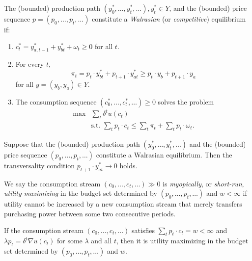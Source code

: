 \begin{defn}
    The (bounded) production path $(y^*_0, \dots, y^*_t, \dots), y^*_t \in Y$, and the (bounded) price sequence $p = (p_0, \dots, p_t, \dots)$ constitute a \emph{Walrasian} (or \emph{competitive}) equilibrium if:
    \begin{enumerate}
        \item 
        $c^*_t = y^*_{a, t - 1} + y^*_{bt} + \omega_t \geq 0$ for all $t$.

        \item 
        For every $t$,
        \begin{equation*}
            \pi_t = p_t \cdot y^*_{bt} + p_{t + 1} \cdot y^*_{at} \geq p_t \cdot y_b + p_{t + 1} \cdot y_a
        \end{equation*}
        for all $y = (y_b, y_a) \in Y$.

        \item 
        The consumption sequence $(c^*_0, \dots, c^*_t, \dots) \geq 0$ solves the problem
        \begin{equation*}
            \begin{aligned}
                \max &\sum_t \delta^t u(c_t) \\
                &\text{s.t. } \sum_t p_t \cdot c_t \leq \sum_t \pi_t + \sum_t p_t \cdot \omega_t.
            \end{aligned}
        \end{equation*}
    \end{enumerate}
\end{defn}

\begin{prop}
    Suppose that the (bounded) production path $(y^*_0, \dots, y^*_t, \dots)$ and the (bounded) price sequence $(p_0, \dots, p_t, \dots)$ constitute a Walrasian equilibrium. Then the transversality condition $p_{t + 1} \cdot y^*_{at} \to 0$ holds.
\end{prop}

\begin{defn}
    We say the consumption stream $(c_0, \dots, c_t, \dots) \gg 0$ is \emph{myopically}, or \emph{short-run}, \emph{utility maximizing} in the budget set determined by $(p_0, \dots, p_t, \dots)$ and $w < \infty$ if utility cannot be increased by a new consumption stream that merely transfers purchasing power between some two consecutive periods.
\end{defn}

\begin{prop}
    If the consumption stream $(c_0, \dots, c_t, \dots)$ satisfies $\sum_t p_t \cdot c_t = w < \infty$ and $\lambda p_t = \delta^t \nabla u(c_t)$ for some $\lambda$ and all $t$, then it is utility maximizing in the budget set determined by $(p_0, \dots, p_t, \dots)$ and $w$.
\end{prop}

